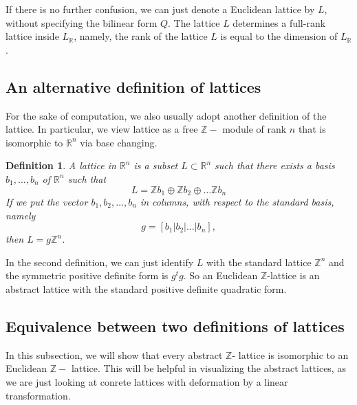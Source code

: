 \documentclass[12pt]{article} %
\newtheorem{definition}{Definition}[section]
\newcommand{\tpoint}[1]{\subsection{#1}}
\begin{document}
If there is no further confusion, we can just denote a Euclidean lattice by $L$, without specifying the bilinear form
$Q$. The lattice $L$ determines a full-rank lattice inside $L_\mathbb{R}$, namely, the rank
of the lattice $L$ is equal to the dimension of $L_\mathbb{R}$.

\tpoint{An alternative definition of lattices}
For the sake of computation, we also usually adopt another definition of the lattice.
In particular, we view lattice as a free $\mathbb{Z}-$ module of rank $n$ that is isomorphic
to $\mathbb{R}^n$ via base changing.
\begin{definition}\label{lattice2}
    A \textit{lattice} in $\mathbb{R}^n$ is a subset $L \subset \mathbb{R}^n$ such that there exists
    a basis $b_1,\ldots,b_n$ of $\mathbb{R}^n$ such that
    \[L = \mathbb{Z}b_1\oplus \mathbb{Z}b_2\oplus \ldots \mathbb{Z}b_n\]
    If we put the vector $b_1,b_2,\ldots,b_n$ in columns, with respect to the standard basis, namely
    \[g = [b_1 | b_2 | \ldots | b_n] ,\]
    then $L = g\mathbb{Z}^n$.
\end{definition}
In the second definition, we can just identify $L$ with the standard lattice $\mathbb{Z}^n$ and the
symmetric positive definite form is $g^tg$. So an Euclidean $\mathbb{Z}$-lattice is an abstract lattice with the standard
positive definite quadratic form.
\tpoint{Equivalence between two definitions of lattices}
In this subsection, we will show that every abstract $\mathbb{Z}$- lattice is isomorphic to an Euclidean $\mathbb{Z}-$ lattice.
This will be helpful in visualizing the abstract lattices, as we are just looking at conrete lattices with deformation by a linear transformation.
\end{document}
